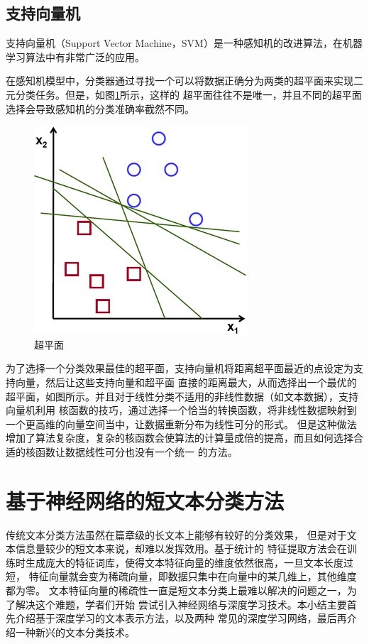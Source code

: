 \subsection{支持向量机}
支持向量机（Support Vector Machine，SVM）是一种感知机的改进算法，在机器学习算法中有非常广泛的应用。

在感知机模型中，分类器通过寻找一个可以将数据正确分为两类的超平面来实现二元分类任务。但是，如图\ref{separating_lines}所示，这样的
超平面往往不是唯一，并且不同的超平面选择会导致感知机的分类准确率截然不同。
\begin{figure}[h]
    \includegraphics[scale=3]{picture/separating-lines.png}
    \caption{超平面}
    \label{separating_lines}
\end{figure}

为了选择一个分类效果最佳的超平面，支持向量机将距离超平面最近的点设定为支持向量，然后让这些支持向量和超平面
直接的距离最大，从而选择出一个最优的超平面，如图所示。并且对于线性分类不适用的非线性数据（如文本数据），支持向量机利用
核函数的技巧，通过选择一个恰当的转换函数，将非线性数据映射到一个更高维的向量空间当中，让数据重新分布为线性可分的形式。
但是这种做法增加了算法复杂度，复杂的核函数会使算法的计算量成倍的提高，而且如何选择合适的核函数让数据线性可分也没有一个统一
的方法。

\section{基于神经网络的短文本分类方法}
传统文本分类方法虽然在篇章级的长文本上能够有较好的分类效果，
但是对于文本信息量较少的短文本来说，却难以发挥效用。基于统计的
特征提取方法会在训练时生成庞大的特征词库，使得文本特征向量的维度依然很高，一旦文本长度过短，
特征向量就会变为稀疏向量，即数据只集中在向量中的某几维上，其他维度都为零。
文本特征向量的稀疏性一直是短文本分类上最难以解决的问题之一，为了解决这个难题，学者们开始
尝试引入神经网络与深度学习技术。本小结主要首先介绍基于深度学习的文本表示方法，以及两种
常见的深度学习网络，最后再介绍一种新兴的文本分类技术。

